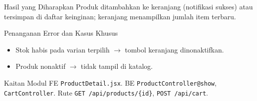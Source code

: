 \begin{flowsection}{Hasil yang Diharapkan}
Produk ditambahkan ke keranjang (notifikasi sukses) atau tersimpan di daftar
keinginan; keranjang menampilkan jumlah item terbaru.
\end{flowsection}

\begin{flowsection}{Penanganan Error dan Kasus Khusus}
\begin{itemize}
  \item Stok habis pada varian terpilih $\rightarrow$ tombol keranjang dinonaktifkan.
  \item Produk nonaktif $\rightarrow$ tidak tampil di katalog.
\end{itemize}
\end{flowsection}

\begin{flowsection}{Kaitan Modul}
FE \texttt{ProductDetail.jsx}. BE \texttt{ProductController@show},
\texttt{CartController}. Rute \texttt{GET /api/products/\{id\}}, \texttt{POST /api/cart}.
\end{flowsection}

